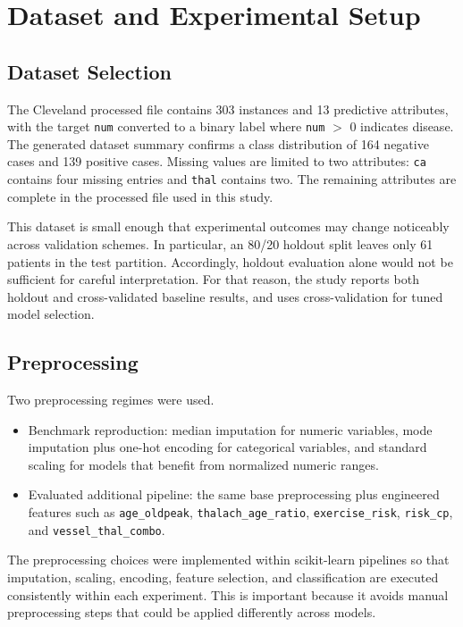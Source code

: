 \documentclass[conference]{IEEEtran}
\begin{document}
\section{Dataset and Experimental Setup}
\subsection{Dataset Selection}
The Cleveland processed file contains 303 instances and 13 predictive attributes, with the target \texttt{num} converted to a binary label where \texttt{num} $>$ 0 indicates disease. The generated dataset summary confirms a class distribution of 164 negative cases and 139 positive cases. Missing values are limited to two attributes: \texttt{ca} contains four missing entries and \texttt{thal} contains two. The remaining attributes are complete in the processed file used in this study.

This dataset is small enough that experimental outcomes may change noticeably across validation schemes. In particular, an 80/20 holdout split leaves only 61 patients in the test partition. Accordingly, holdout evaluation alone would not be sufficient for careful interpretation. For that reason, the study reports both holdout and cross-validated baseline results, and uses cross-validation for tuned model selection.

\subsection{Preprocessing}
Two preprocessing regimes were used.
\begin{itemize}
\item Benchmark reproduction: median imputation for numeric variables, mode imputation plus one-hot encoding for categorical variables, and standard scaling for models that benefit from normalized numeric ranges.
\item Evaluated additional pipeline: the same base preprocessing plus engineered features such as \texttt{age\_oldpeak}, \texttt{thalach\_age\_ratio}, \texttt{exercise\_risk}, \texttt{risk\_cp}, and \texttt{vessel\_thal\_combo}.
\end{itemize}

The preprocessing choices were implemented within scikit-learn pipelines so that imputation, scaling, encoding, feature selection, and classification are executed consistently within each experiment. This is important because it avoids manual preprocessing steps that could be applied differently across models.
\end{document}
